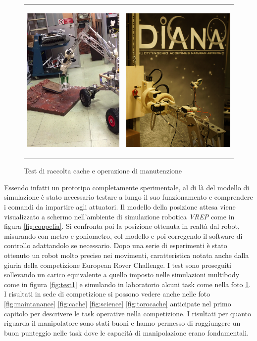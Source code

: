\documentclass[%
corpo=11pt,
twoside,
 stile=classica,
oldstyle,
greek,%
]{toptesi}
\begin{document}
\begin{figure}
	\centering
	\begin{tabular}{ll}
		\includegraphics[height=8cm,keepaspectratio]{image/cace.png}
		&
		\includegraphics[height=8cm,keepaspectratio]{image/mant.jpg}
	\end{tabular}
	\caption{Test di raccolta cache e operazione di manutenzione}
	\label{fig:test2}
\end{figure}	
 	Essendo infatti un prototipo completamente sperimentale, al di là del modello di simulazione è stato necessario testare a lungo il suo funzionamento e comprendere i comandi da impartire agli attuatori. 
 	Il modello della posizione attesa viene visualizzato a schermo nell'ambiente di simulazione robotica \textit{VREP} come in figura \ref{fig:coppelia}. Si confronta poi la posizione ottenuta in realtà dal robot, misurando con metro e goniometro, col modello e poi corregendo il software di controllo adattandolo se necessario. 
 	Dopo una serie di esperimenti è stato ottenuto un robot molto preciso nei movimenti, caratteristica notata anche dalla giuria della competizione European Rover Challenge. 
 	I test sono proseguiti sollevando un carico equivalente a quello imposto nelle simulazioni multibody come in figura \ref{fig:test1} e simulando in laboratorio alcuni task come nella foto \ref{fig:test2}. 
 	I risultati in sede di competizione si possono vedere anche nelle foto \ref{fig:maintanance} \ref{fig:cache} \ref{fig:science} \ref{fig:torocache} anticipate nel primo capitolo per descrivere le task operative nella competizione. I risultati per quanto riguarda il manipolatore sono stati buoni e hanno permesso di raggiungere un buon punteggio nelle task dove le capacità di manipolazione erano fondamentali. 
 		
\end{document}
